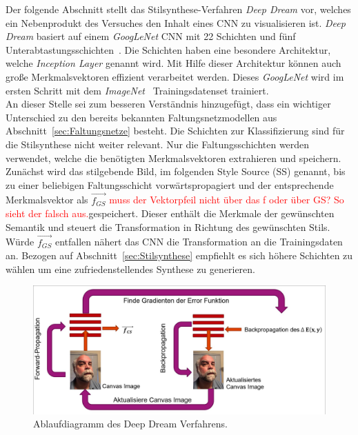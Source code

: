 \documentclass[times, 11pt,twocolumn]{article}
\begin{document}
 \label{sec:DeepDream}
Der folgende Abschnitt stellt das Stilsynthese-Verfahren \textit{Deep Dream} \cite{DeepDream} vor, welches ein Nebenprodukt des Versuches den Inhalt eines CNN zu visualisieren ist. \textit{Deep Dream} basiert auf einem \textit{GoogLeNet} CNN mit 22 Schichten und fünf Unterabtastungsschichten~\cite{Szegedy_2015_CVPR}. Die Schichten haben eine besondere Architektur, welche \textit{Inception Layer} genannt wird. Mit Hilfe dieser Architektur können auch große Merkmalsvektoren effizient verarbeitet werden. Dieses \textit{GoogLeNet} wird im ersten Schritt mit dem \textit{\textit{ImageNet}}~\cite{ImageNet} Trainingsdatenset trainiert.\\
An dieser Stelle sei zum besseren Verständnis hinzugefügt, dass ein wichtiger Unterschied zu den bereits bekannten Faltungsnetzmodellen aus Abschnitt~\ref{sec:Faltungsnetze} besteht. Die Schichten zur Klassifizierung sind für die Stilsynthese nicht weiter relevant. Nur die Faltungsschichten werden verwendet, welche die benötigten Merkmalsvektoren extrahieren und speichern.\\
Zunächst wird das stilgebende Bild, im folgenden Style Source (SS) genannt, bis zu einer beliebigen Faltungsschicht vorwärtspropagiert und der entsprechende Merkmalsvektor als $\vec{f_{GS}}$ \textcolor{red}{muss der Vektorpfeil nicht über das f oder über GS? So sieht der falsch aus.}gespeichert. Dieser enthält die Merkmale der gewünschten Semantik und steuert die Transformation in Richtung des gewünschten Stils. Würde $\vec{f_{GS}}$ entfallen nähert das CNN die Transformation an die Trainingsdaten an. Bezogen auf Abschnitt~\ref{sec:Stilsynthese} empfiehlt es sich höhere Schichten zu wählen um eine zufriedenstellendes Synthese zu generieren.\\
\begin{figure}
	\flushleft
	\includegraphics[width=\columnwidth]{Bilder/DeepDream.jpg}
	\caption{Ablaufdiagramm des Deep Dream Verfahrens.}
	\label{fig:DeepDream}
\end{figure}
\end{document}
